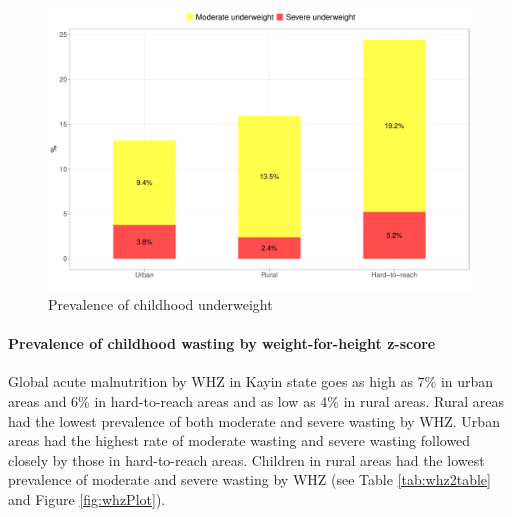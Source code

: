 \documentclass[12pt,a4paper]{article}
\let\oldparagraph\paragraph
\renewcommand{\paragraph}[1]{\oldparagraph{#1}\mbox{}}
\begin{document}
\begin{figure}[H]

{\centering \includegraphics{kayinReport_files/figure-latex/underweightPlot-1} 

}

\caption{Prevalence of childhood underweight}\label{fig:underweightPlot}
\end{figure}

\hypertarget{whz}{%
\paragraph{Prevalence of childhood wasting by weight-for-height z-score}\label{whz}}

Global acute malnutrition by WHZ in Kayin state goes as high as 7\% in urban areas and 6\% in hard-to-reach areas and as low as 4\% in rural areas. Rural areas had the lowest prevalence of both moderate and severe wasting by WHZ. Urban areas had the highest rate of moderate wasting and severe wasting followed closely by those in hard-to-reach areas. Children in rural areas had the lowest prevalence of moderate and severe wasting by WHZ (see Table \ref{tab:whz2table} and Figure \ref{fig:whzPlot}).
\end{document}
